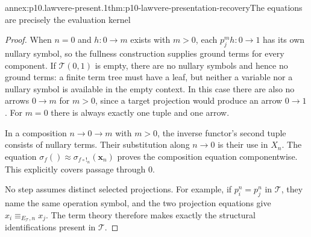 \begin{annexitem}{annex:p10.lawvere-present.1}{thm:p10-lawvere-presentation-recovery}{The equations are precisely the evaluation kernel}
\begin{proof}
When \(n=0\) and \(h:0\to m\) exists with \(m>0\), each
\(p_j^m h:0\to1\) has its own nullary symbol, so the fullness
construction supplies ground terms for every component.
If \(\mathcal T(0,1)\) is empty, there are no nullary symbols
and hence no ground terms: a finite term tree must have a
leaf, but neither a variable nor a nullary symbol is available
in the empty context.  In this case there are also no arrows
\(0\to m\) for \(m>0\), since a target projection would
produce an arrow \(0\to1\).
For \(m=0\) there is always exactly one tuple and one arrow.

In a composition \(n\to0\to m\) with \(m>0\), the inverse
functor's second tuple consists of nullary terms.
Their substitution along \(n\to0\) is their use in \(X_n\).
The equation
\(\sigma_f()\approx\sigma_{f\circ!_n}(\mathbf x_n)\)
proves the composition equation componentwise.  This
explicitly covers passage through \(0\).

No step assumes distinct selected projections.
For example, if \(p_i^n=p_j^n\) in \(\mathcal T\), they name
the same operation symbol, and the two projection equations
give \(x_i\equiv_{E_{\mathcal T},n}x_j\).
The term theory therefore makes exactly the structural
identifications present in \(\mathcal T\).
\end{proof}
\end{annexitem}


